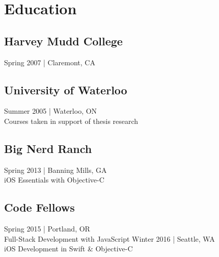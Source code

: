 \documentclass[]{jhearn-resume}
\begin{document}
\begin{minipage}[t]{0.30\textwidth} 

\vspace{25pt}

\vspace{-\topsep}
\section{Education} 

\subsection{Harvey Mudd College}
{\footnotesize Spring 2007 | Claremont, CA}
\sectionsep

\subsection{University of Waterloo}
{\small Summer 2005 | Waterloo, ON}\\
{\footnotesize Courses taken in support of thesis research}
\sectionsep

\subsection{Big Nerd Ranch}
{\small Spring 2013 | Banning Mills, GA}\\
{\footnotesize iOS Essentials with Objective-C}
\sectionsep

\subsection{Code Fellows}
{\small Spring 2015 | Portland, OR}\\
{\footnotesize Full-Stack Development with JavaScript}
%
{\small Winter 2016 | Seattle, WA}\\
{\footnotesize iOS Development in Swift \& Objective-C}
\sectionsep



\end{minipage}
\end{document}
